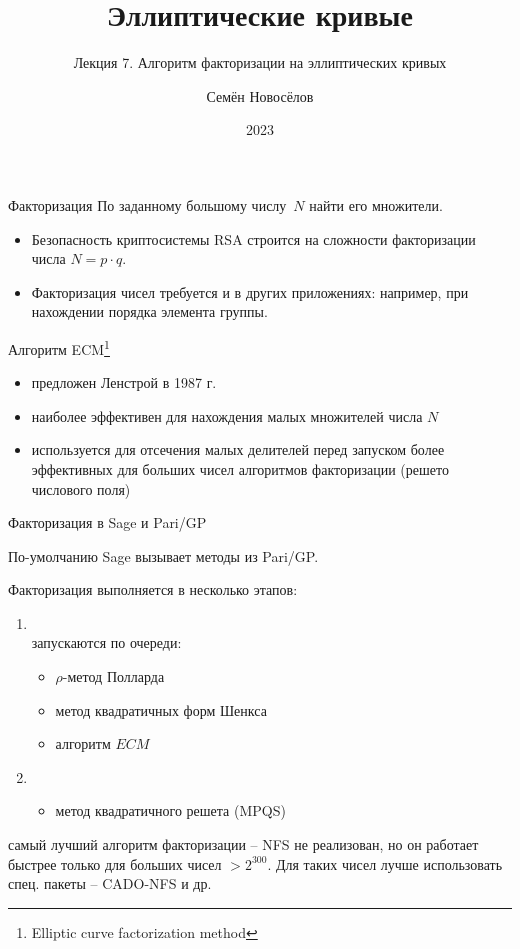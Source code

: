 \documentclass{beamer}
\title{Эллиптические кривые}
\subtitle{Лекция 7. Алгоритм факторизации на эллиптических кривых}
\author{Семён Новосёлов}
\institute{БФУ им. И. Канта}
\date{2023}
\begin{document}
\frame{\titlepage}

\begin{frame}{Факторизация}
	По заданному большому числу~$N$ найти его множители.

	\vspace{1em}

	\begin{itemize}
		\item Безопасность криптосистемы RSA строится на сложности факторизации числа $N = p \cdot q$.
		\vspace{0.5em}
		\item Факторизация чисел требуется и в других приложениях: например, при нахождении порядка элемента группы.
	\end{itemize}
\end{frame}

\begin{frame}{Алгоритм ECM\footnote{Elliptic curve factorization method}}
	\begin{itemize}
		\item предложен Ленстрой в 1987 г.
		\item наиболее эффективен для нахождения малых множителей числа $N$
		\item используется для отсечения малых делителей перед запуском более эффективных для больших чисел алгоритмов факторизации (решето числового поля)
	\end{itemize}
\end{frame}

\begin{frame}{Факторизация в Sage и Pari/GP}
	
	По-умолчанию Sage вызывает методы из Pari/GP.
	\vspace{1em}

	Факторизация выполняется в несколько этапов:
	\vspace{0.5em}
	\begin{enumerate}
		\item {}\\запускаются по очереди:
		\begin{itemize}
			\item $\rho$-метод Полларда
			\item метод квадратичных форм Шенкса
			\item алгоритм $ECM$
		\end{itemize}
		\vspace{0.5em}
		\item  {}
		\begin{itemize}
			\item метод квадратичного решета (MPQS)
		\end{itemize} 
	\end{enumerate}
	
	\vspace{3em}
	\begin{small}
		 самый лучший алгоритм факторизации -- NFS не реализован, но он работает быстрее только для больших чисел $> 2^{300}$. Для таких чисел лучше использовать спец. пакеты -- CADO-NFS и др.
	\end{small}
\end{frame}
\end{document}
